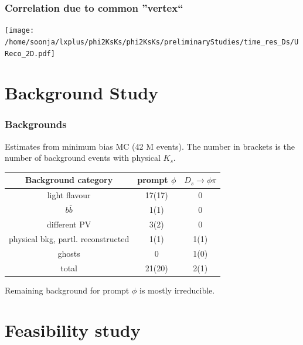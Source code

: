 \documentclass{beamer}
\begin{document}
\begin{frame}

\frametitle{Correlation due to common ''vertex``}
\begin{center}
\texttt{[image: /home/soonja/lxplus/phi2KsKs/phi2KsKs/preliminaryStudies/time\_res\_Ds/UReco\_2D.pdf]}
\end{center}

\end{frame}




\section{Background Study}
\begin{frame}[fragile]
\frametitle{Backgrounds}
Estimates from minimum bias MC (42 M events). The number in brackets is the number of background events with physical $K_s$.
\begin{center}
\begin{tabular}{c|c|c}
Background category & prompt $\phi$ & $D_s \rightarrow \phi \pi$ \\ 
\hline 
light flavour & 17(17) & 0 \\ 
$b\overline{b}$ & 1(1) & 0 \\ 
different PV & 3(2) & 0 \\ 
physical bkg, partl. reconstructed & 1(1) & 1(1) \\ 
ghosts & 0 & 1(0) \\ 
\hline 
total & 21(20) & 2(1) \\  
\end{tabular} 
\end{center}
Remaining background for prompt $\phi$ is mostly irreducible.

\end{frame}

\section{Feasibility study}
\end{document}
